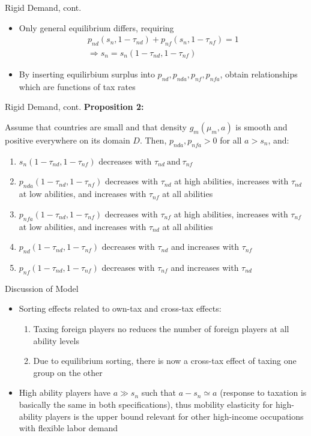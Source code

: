 \documentclass[aspectratio=169,professionalfonts]{beamer}
\newcommand{\hl}[1]{\textbf{\textcolor{UGARed}{#1}}}
\newcommand{\hl}[1]{\textbf{\color{UGARed}{#1}}}
\begin{document}
\begin{frame}{Rigid Demand, cont.}
  \begin{itemize}
    \item Only general equilibrium differs, requiring
    \begin{gather*}
      p_{nd}(s_n,1-\tau_{nd}) + p_{nf}(s_n, 1-\tau_{nf}) = 1 \\
      \Rightarrow s_n = s_n(1-\tau_{nd}, 1-\tau_{nf})
    \end{gather*}
    \item By inserting equilirbium surplus into $p_{nd}, p_{nda}, p_{nf}, p_{nfa}$, obtain relationships which are functions of tax rates
  \end{itemize}
\end{frame}
\begin{frame}{Rigid Demand, cont.}
  \hl{Proposition 2:}
  \begin{tcolorbox}[colback=red!5!white,colframe=red!75!black]
    Assume that countries are small and that density $g_m(\mu_m, a)$ is smooth and positive everywhere on its domain $D$. Then, $p_{nda}, p_{nfa}>0$ for all $a > s_n$, and:
    \begin{enumerate}
      \item $s_n(1-\tau_{nd}, 1-\tau_{nf})$ decreases with $\tau_{nd} \ \text{and} \ \tau_{nf}$
      \item $p_{nda}(1-\tau_{nd}, 1-\tau_{nf})$ decreases with $\tau_{nd}$ at high abilities, increases with $\tau_{nd}$ at low abilities, and increases with $\tau_{nf}$ at all abilities
      \item $p_{nfa}(1-\tau_{nd}, 1-\tau_{nf})$ decreases with $\tau_{nf}$ at high abilities, increases with $\tau_{nf}$ at low abilities, and increases with $\tau_{nd}$ at all abilities
      \item $p_{nd}(1-\tau_{nd}, 1-\tau_{nf})$ decreases with $\tau_{nd}$ and increases with $\tau_{nf}$
      \item $p_{nf}(1-\tau_{nd}, 1-\tau_{nf})$ decreases with $\tau_{nf}$ and increases with $\tau_{nd}$
    \end{enumerate}
  \end{tcolorbox}
\end{frame}
\begin{frame}{Discussion of Model}
  \begin{itemize}
    \item Sorting effects related to own-tax and cross-tax effects:
    \begin{enumerate}
      \item Taxing foreign players no reduces the number of foreign players at all ability levels
      \item Due to equilibrium sorting, there is now a cross-tax effect of taxing one group on the other
    \end{enumerate}
    \item High ability players have $a \gg s_n$ such that $a - s_n \simeq a$ (response to taxation is basically the same in both specifications), thus mobility elasticity for high-ability players is the upper bound relevant for other high-income occupations with flexible labor demand
  \end{itemize}
  \end{frame}
\end{document}
